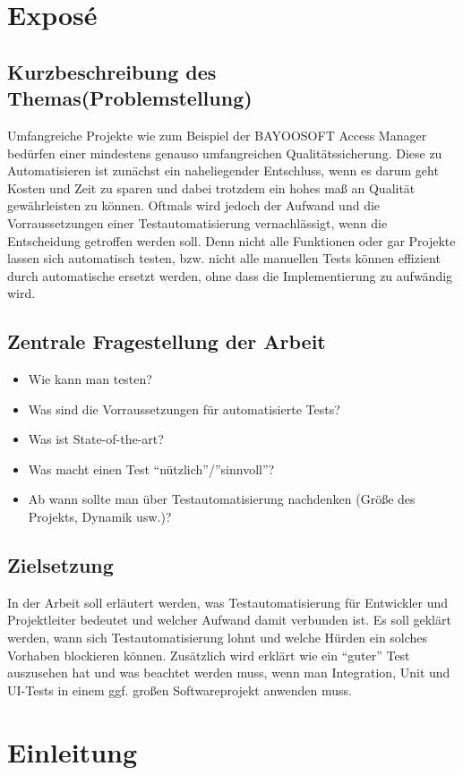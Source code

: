\chapter{Exposé}
\label{ch:expose}
%
\section{Kurzbeschreibung des Themas(Problemstellung)}
Umfangreiche Projekte wie zum Beispiel der BAYOOSOFT Access Manager bedürfen einer mindestens genauso umfangreichen Qualitätssicherung. Diese zu Automatisieren ist zunächst ein naheliegender Entschluss, wenn es darum geht Kosten und Zeit zu sparen und dabei trotzdem ein hohes maß an Qualität gewährleisten zu können. Oftmals wird jedoch der Aufwand und die Vorraussetzungen einer Testautomatisierung vernachlässigt, wenn die Entscheidung getroffen werden soll. Denn nicht alle Funktionen oder gar Projekte lassen sich automatisch testen, bzw. nicht alle manuellen Tests können effizient durch automatische ersetzt werden, ohne dass die Implementierung zu aufwändig wird.
\section{Zentrale Fragestellung der Arbeit}
\begin{itemize}
    \item Wie kann man testen?
    \item Was sind die Vorraussetzungen für automatisierte Tests?
    \item Was ist State-of-the-art?
    \item Was macht einen Test “nützlich”/”sinnvoll”?
    \item Ab wann sollte man über Testautomatisierung nachdenken (Größe des Projekts, Dynamik usw.)?
\end{itemize}
\section{Zielsetzung}
In der Arbeit soll erläutert werden, was Testautomatisierung für Entwickler und Projektleiter bedeutet und welcher Aufwand damit verbunden ist. Es soll geklärt werden, wann sich Testautomatisierung lohnt und welche Hürden ein solches Vorhaben blockieren können. Zusätzlich wird erklärt wie ein “guter” Test auszusehen hat und was beachtet werden muss, wenn man Integration, Unit und UI-Tests in einem ggf. großen Softwareprojekt anwenden muss.

\chapter{Einleitung}
